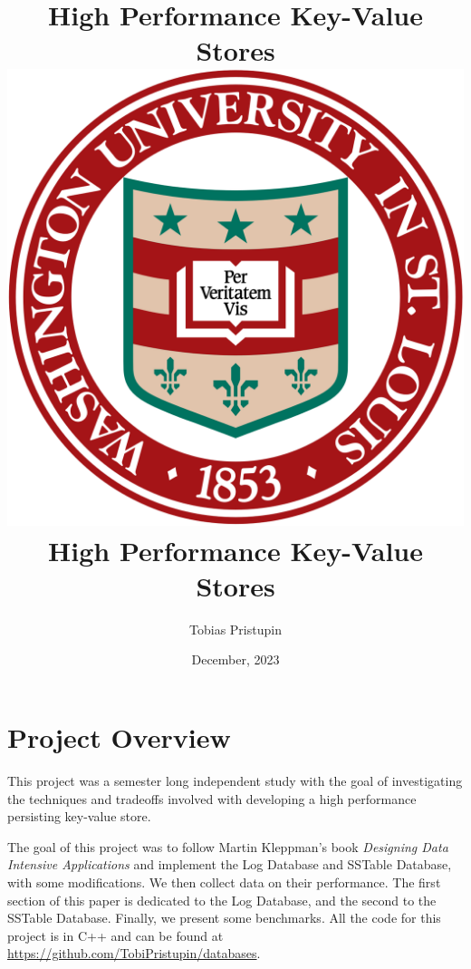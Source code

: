 \documentclass[10pt]{extarticle}
\title{High Performance Key-Value Stores}
\author{Tobias Pristupin}
\date{December, 2023}
\begin{document}
\title{\vspace{-2.0cm}\includegraphics[scale=0.1]{washu_logo.png} 
\\[1cm]
High Performance Key-Value Stores}
\maketitle
\tableofcontents
\newpage

\section{Project Overview}
This project was a semester long independent study with the goal of investigating the techniques and tradeoffs involved with developing a high performance persisting key-value store. 

The goal of this project was to follow Martin Kleppman's book \textit{Designing Data Intensive Applications} \cite{Kleppmann} and implement the Log Database and SSTable Database, with some modifications. We then collect data on their performance. The first section of this paper is dedicated to the Log Database, and the second to the SSTable Database. Finally, we present some benchmarks. All the code for this project is in C++ and can be found at \href{https://github.com/TobiPristupin/databases}{https://github.com/TobiPristupin/databases}.
\end{document}
